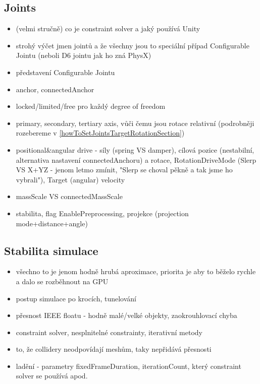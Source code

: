 \subsection{Joints}
\begin{itemize}
    \item (velmi stručně) co je constraint solver a jaký používá Unity
    \item strohý výčet jmen jointů a že všechny jsou to speciální případ Configurable Jointu (neboli D6 jointu jak ho zná PhysX)
    \item představení Configurable Jointu
    \item anchor, connectedAnchor
    \item locked/limited/free pro každý degree of freedom
    \item primary, secondary, tertiary axis, vůči čemu jsou rotace relativní (podrobněji rozebereme v \ref{howToSetJointsTargetRotationSection})
    \item positional\&angular drive - síly (spring VS damper), cílová pozice (nestabilní, alternativa nastavení connectedAnchoru) a rotace, RotationDriveMode (Slerp VS X+YZ - jenom letmo zmínit, "Slerp se choval pěkně a tak jsme ho vybrali"), Target (angular) velocity
    \item massScale VS connectedMassScale
    \item stabilita, flag EnablePreprocessing, projekce (projection mode+distance+angle)
\end{itemize}


\subsection{Stabilita simulace}
\begin{itemize}
    \item všechno to je jenom hodně hrubá aproximace, priorita je aby to běželo rychle a dalo se rozběhnout na GPU
    \item postup simulace po krocích, tunelování
    \item přesnost IEEE floatu - hodně malé/velké objekty, zaokrouhlovací chyba
    \item constraint solver, nesplnitelné constrainty, iterativní metody
    \item to, že collidery neodpovídají meshům, taky nepřidává přesnosti
    \item ladění - parametry fixedFrameDuration, iterationCount, který constraint solver se používá apod.
\end{itemize}


